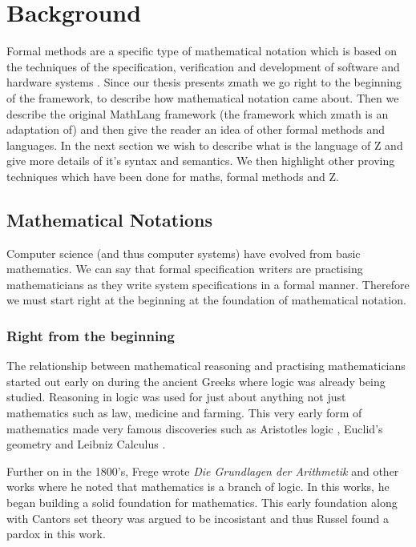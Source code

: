 \chapter{Background}
\label{ch:background}

Formal methods are a specific type of mathematical notation which is based on the techniques of the specification, verification and development of software and hardware systems \cite{whatareformalmethods}. Since our thesis presents \gls{zmath} we go right to the beginning of the framework, to describe how mathematical notation came about. Then we describe the original MathLang framework (the framework which \gls{zmath} is an adaptation of) and then give the reader an idea of other formal methods and languages. In the next section we wish to describe what is the language of Z and give more details of it's syntax and semantics. We then highlight other proving techniques which have been done for maths, formal methods and Z.

\section{Mathematical Notations}

Computer science (and thus computer systems) have evolved from basic mathematics. We can say that formal specification writers are practising mathematicians as they write system specifications in a formal manner. Therefore we must start right at the beginning at the foundation of mathematical notation.

\subsection{Right from the beginning}

The relationship between mathematical reasoning and practising mathematicians started out early on during the ancient Greeks where logic was already being studied. Reasoning in logic was used for just about anything not just mathematics such as law, medicine and farming. This very early form of mathematics made very famous discoveries such as Aristotles logic \cite{aristotle}, Euclid's geometry \cite{euclid} and Leibniz Calculus \cite{leibniz}.

Further on in the 1800's, Frege wrote \emph{Die Grundlagen der Arithmetik} \cite{frege} and other works where he noted that mathematics is a branch of logic. In this works, he began building a solid foundation for mathematics. This early foundation along with Cantors set theory \cite{cantor} was argued to be incosistant and thus Russel found a pardox in this work.

